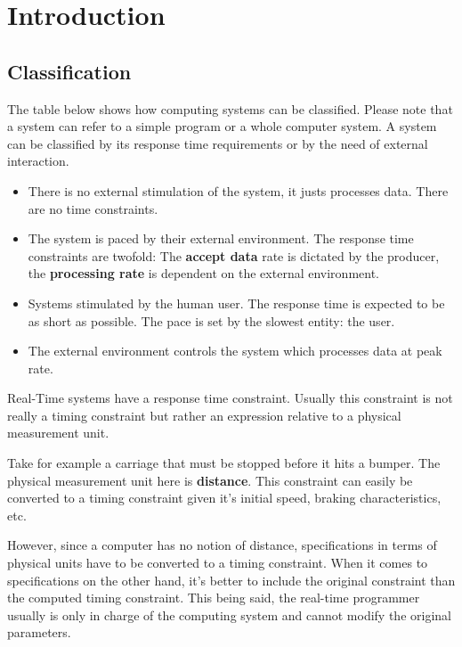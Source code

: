 \documentclass[../main.tex]{subfiles}
\begin{document}
\chapter{Introduction}

\section{Classification}

The table below shows how computing systems can be classified. Please note that a system can refer to a simple program or a whole computer system. A system can be classified by its response time requirements or by the need of external interaction. 

\begin{itemize}
	\item {} 
	There is no external stimulation of the system, it justs processes data. There are no time constraints.
	\item {}
	The system is paced by their external environment. The response time constraints are twofold: The \textbf{accept data} rate is dictated by the producer, the \textbf{processing rate} is dependent on the external environment.
	\item {}
	Systems stimulated by the human user. The response time is expected to be as short as possible. The pace is set by the slowest entity: the user.
	\item {}
	The external environment controls the system which processes data at peak rate.
\end{itemize}

Real-Time systems have a response time constraint. Usually this constraint is not really a timing constraint but rather an expression relative to a physical measurement unit.

\begin{exmp}
Take for example a carriage that must be stopped before it hits a bumper. The physical measurement unit here is \textbf{distance}. This constraint can easily be converted to a timing constraint given it's initial speed, braking characteristics, etc. 
\end{exmp}

However, since a computer has no notion of distance, specifications in terms of physical units have to be converted to a timing constraint.
When it comes to specifications on the other hand, it's better to include the original constraint than the computed timing constraint.
This being said, the real-time programmer usually is only in charge of the computing system and cannot modify the original parameters.
\end{document}
